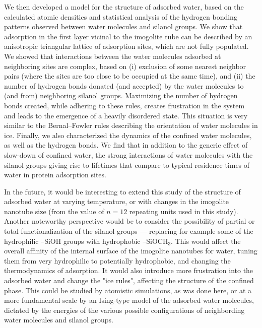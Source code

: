\documentclass[thesis]{subfiles}
\begin{document}
We then developed a model for the structure of adsorbed water, based on the
calculated atomic densities and statistical analysis of the hydrogen bonding
patterns observed between water molecules and silanol groups. We show that
adsorption in the first layer vicinal to the imogolite tube can be described by
an anisotropic triangular lattice of adsorption sites, which are not fully
populated. We showed that interactions between the water molecules adsorbed at
neighboring sites are complex, based on (i) exclusion of some nearest neighbor
pairs (where the sites are too close to be occupied at the same time), and (ii)
the number of hydrogen bonds donated (and accepted) by the water molecules to
(and from) neighboring silanol groups. Maximizing the number of hydrogen bonds
created, while adhering to these rules, creates frustration in the system and
leads to the emergence of a heavily disordered state. This situation is very
similar to the Bernal--Fowler rules describing the orientation of water
molecules in ice\cite{Bernal1933}. Finally, we also characterized the
dynamics of the confined water molecules, as well as the hydrogen bonds. We find
that in addition to the generic effect of slow-down of confined water, the
strong interactions of water molecules with the silanol groups giving rise to
lifetimes that compare to typical residence times of water in protein adsorption
sites.

In the future, it would be interesting to extend this study of the structure of
adsorbed water at varying temperature, or with changes in the imogolite nanotube
size (from the value of $n=12$ repeating units used in this study). Another
noteworthy perspective would be to consider the possibility of partial or total
functionalization of the silanol groups --- replacing for example some of the
hydrophilic --SiOH groups with hydrophobic --SiOCH$_{\text{3}}$. This would
affect the overall affinity of the internal surface of the imogolite nanotubes
for water, tuning them from very hydrophilic to potentially
hydrophobic\cite{Bonelli2016}, and changing the thermodynamics of adsorption. It
would also introduce more frustration into the adsorbed water and change the
"ice rules", affecting the structure of the confined phase. This could be
studied by atomistic simulations, as was done here, or at a more fundamental
scale by an Ising-type model of the adsorbed water molecules, dictated by the
energies of the various possible configurations of neighbording water molecules
and silanol groups.

\OnlyInSubfile{\printbibliography}
\end{document}
